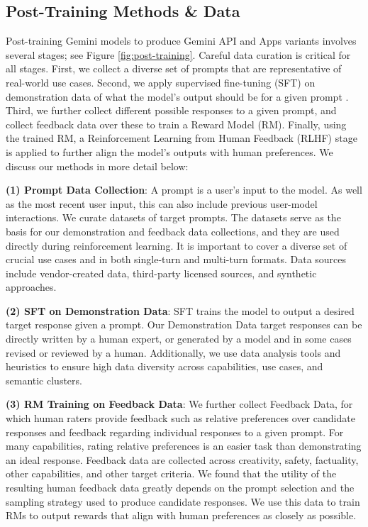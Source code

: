 \subsection{Post-Training Methods \& Data}
\label{sec:post-training-data}

Post-training Gemini models to produce Gemini API and Apps variants involves several stages; see Figure \ref{fig:post-training}. Careful data curation is critical for all stages. First, we collect a diverse set of prompts that are representative of real-world use cases. Second, we apply supervised fine-tuning (SFT) on demonstration data of what the model’s output should be for a given prompt \citep{wei2021finetuned, ouyang2022training, mishra2021cross}. Third, we further collect different possible responses to a given prompt, and collect feedback data over these to train a Reward Model (RM). Finally, using the trained RM, a Reinforcement Learning from Human Feedback (RLHF) stage~\citep{Bai2022-us} is applied to further align the model's outputs with human preferences. We discuss our methods in more detail below:

\textbf{(1) Prompt Data Collection}: A prompt is a user’s input to the model. As well as the most recent user input, this can also include previous user-model interactions. We curate datasets of target prompts. The datasets serve as the basis for our demonstration and feedback data collections, and they are used directly during reinforcement learning. It is important to cover a diverse set of crucial use cases and in both single-turn and multi-turn formats. Data sources include vendor-created data, third-party licensed sources, and synthetic approaches. 

\textbf{(2) SFT on Demonstration Data}: SFT trains the model to output a desired target response given a prompt. Our Demonstration Data target responses can be directly written by a human expert, or generated by a model and in some cases revised or reviewed by a human. Additionally, we use data analysis tools and heuristics to ensure high data diversity across capabilities, use cases, and semantic clusters. 

\textbf{(3) RM Training on Feedback Data}: We further collect Feedback Data, for which human raters provide feedback such as relative preferences over candidate responses and feedback regarding individual responses to a given prompt. For many capabilities, rating relative preferences is an easier task than demonstrating an ideal response. Feedback data are collected across creativity, safety, factuality, other capabilities, and other target criteria. We found that the utility of the resulting human feedback data greatly depends on the prompt selection and the sampling strategy used to produce candidate responses.  We use this data to train RMs to output rewards that align with human preferences as closely as possible. 

